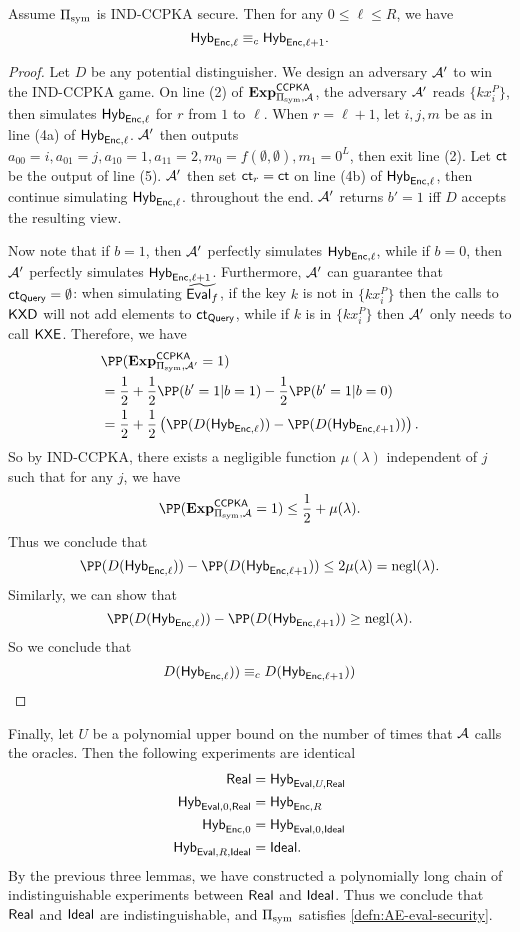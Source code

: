 \begin{lemma}
    Assume $\Pi_{\text{sym}}$ is IND-CCPKA secure. Then for any $0 \leq \ell \leq R$, we have
    $$\mathsf{Hyb}_{\mathsf{Enc}, \ell} \equiv_c \mathsf{Hyb}_{\mathsf{Enc}, \ell + 1}.$$
\end{lemma}
\begin{proof}
    Let $D$ be any potential distinguisher. We design an adversary $\mathcal{A}'$ to win the IND-CCPKA game. On line (2) of $\mathbf{Exp}^{\mathsf{CCPKA}}_{\Pi_{\text{sym}}, \mathcal{A}}$, the adversary $\mathcal{A}'$ reads $\{kx_i^P\}$, then simulates $\mathsf{Hyb}_{\mathsf{Enc}, \ell}$ for $r$ from $1$ to $\ell$. When $r = \ell + 1$, let $i, j, m$ be as in line (4a) of $\mathsf{Hyb}_{\mathsf{Enc}, \ell}$. $\mathcal{A}'$ then outputs $a_{00} = i, a_{01} = j, a_{10} = 1, a_{11} = 2, m_0 = f(\emptyset, \emptyset), m_1 = 0^L$, then exit line (2). Let $\mathsf{ct}$ be the output of line (5). $\mathcal{A}'$ then set $\mathsf{ct}_r = \mathsf{ct}$ on line (4b) of $\mathsf{Hyb}_{\mathsf{Enc}, \ell}$, then continue simulating $\mathsf{Hyb}_{\mathsf{Enc}, \ell}$. throughout the end. $\mathcal{A}'$ returns $b' = 1$ iff $D$ accepts the resulting view.

     Now note that if $b = 1$, then $\mathcal{A}'$ perfectly simulates $\mathsf{Hyb}_{\mathsf{Enc}, \ell}$, while if $b = 0$, then $\mathcal{A}'$ perfectly simulates $\mathsf{Hyb}_{\mathsf{Enc}, \ell+1}$. Furthermore, $\mathcal{A}'$ can guarantee that $\mathsf{ct}_{\mathsf{Query}} = \emptyset$: when simulating $\widetilde{\mathsf{Eval}_f}$, if the key $k$ is not in $\{kx_i^P\}$ then the calls to $\mathsf{KXD}$ will not add elements to $\mathsf{ct}_{\mathsf{Query}}$, while if $k$ is in $\{kx_i^P\}$ then $\mathcal{A}'$ only needs to call $\mathsf{KXE}$. Therefore, we have
    \begin{align*}
     &\PP(\mathbf{Exp}^{\mathsf{CCPKA}}_{\Pi_{\sym}, \cA'} = 1) \\
     &= \frac{1}{2} + \frac{1}{2}\PP(b' = 1 | b = 1) - \frac{1}{2}\PP(b' = 1 | b = 0) \\   
     &= \frac{1}{2} + \frac{1}{2}\left(\PP(D(\Hyb_{\enc, \ell})) - \PP(D(\Hyb_{\enc, \ell+1}))\right).
    \end{align*}
    So by IND-CCPKA, there exists a negligible function $\mu(\lambda)$ independent of $j$ such that for any $j$, we have
    $$\PP(\mathbf{Exp}^{\mathsf{CCPKA}}_{\Pi_{\sym}, \cA} = 1) \leq \frac{1}{2} + \mu(\lambda).$$
    Thus we conclude that
    $$\PP(D(\Hyb_{\enc, \ell})) - \PP(D(\Hyb_{\enc, \ell+1})) \leq 2\mu(\lambda) = \negl(\lambda).$$
    Similarly, we can show that
    $$\PP(D(\Hyb_{\enc, \ell})) - \PP(D(\Hyb_{\enc, \ell+1})) \geq \negl(\lambda).$$
    So we conclude that
    $$D(\mathsf{Hyb}_{\mathsf{Enc}, \ell})) \equiv_c D(\mathsf{Hyb}_{\mathsf{Enc}, \ell + 1}))$$
\end{proof}
Finally, let $U$ be a polynomial upper bound on the number of times that $\mathcal{A}$ calls the oracles. Then the following experiments are identical
\begin{align*}
\mathsf{Real} &= \mathsf{Hyb}_{\mathsf{Eval}, U, \mathsf{Real}} \\
\mathsf{Hyb}_{\mathsf{Eval}, 0, \mathsf{Real}} &= \mathsf{Hyb}_{\mathsf{Enc}, R} \\
\mathsf{Hyb}_{\mathsf{Enc}, 0} &= \mathsf{Hyb}_{\mathsf{Eval}, 0, \mathsf{Ideal}} \\
\mathsf{Hyb}_{\mathsf{Eval}, R, \mathsf{Ideal}} &= \mathsf{Ideal}.
\end{align*}
By the previous three lemmas, we have constructed a polynomially long chain of indistinguishable experiments between $\mathsf{Real}$ and $\mathsf{Ideal}$. Thus we conclude that $\mathsf{Real}$ and $\mathsf{Ideal}$ are indistinguishable, and $\Pi_{\text{sym}}$ satisfies \cref{defn:AE-eval-security}.